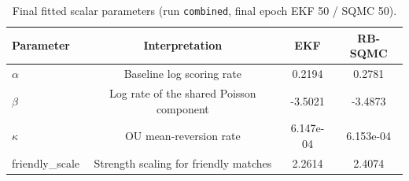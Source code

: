 \begin{table}[ht]
\centering
\caption{Final fitted scalar parameters (run \texttt{combined}, final epoch EKF 50 / SQMC 50).}
\begin{tabular}{lccc}
\toprule
Parameter & Interpretation & EKF & RB-SQMC \\
\midrule
$\alpha$ & Baseline log scoring rate & 0.2194 & 0.2781 \\
$\beta$ & Log rate of the shared Poisson component & -3.5021 & -3.4873 \\
$\kappa$ & OU mean-reversion rate & 6.147e-04 & 6.153e-04 \\
friendly\_scale & Strength scaling for friendly matches & 2.2614 & 2.4074 \\
\bottomrule
\end{tabular}
\end{table}
